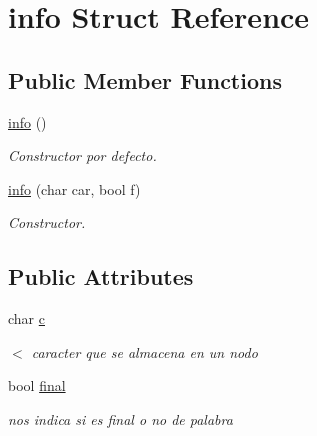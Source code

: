\hypertarget{structinfo}{\section{info Struct Reference}
\label{structinfo}
}
\subsection*{Public Member Functions}
\begin{DoxyCompactItemize}
\item 
\hypertarget{structinfo_af6a5d3bc4c62a93aba929cdaa518688b}{\hyperlink{structinfo_af6a5d3bc4c62a93aba929cdaa518688b}{info} ()}\label{structinfo_af6a5d3bc4c62a93aba929cdaa518688b}

\begin{DoxyCompactList}\small\item\em Constructor por defecto. \end{DoxyCompactList}\item 
\hyperlink{structinfo_aba5645c74337381b0dd25577ab8e3697}{info} (char car, bool f)
\begin{DoxyCompactList}\small\item\em Constructor. \end{DoxyCompactList}\end{DoxyCompactItemize}
\subsection*{Public Attributes}
\begin{DoxyCompactItemize}
\item 
\hypertarget{structinfo_ac4538383891b4f55b84189fdb3af700f}{char \hyperlink{structinfo_ac4538383891b4f55b84189fdb3af700f}{c}}\label{structinfo_ac4538383891b4f55b84189fdb3af700f}

\begin{DoxyCompactList}\small\item\em $<$ caracter que se almacena en un nodo \end{DoxyCompactList}\item 
\hypertarget{structinfo_a1b66486bf4c191788c85723ba71df997}{bool \hyperlink{structinfo_a1b66486bf4c191788c85723ba71df997}{final}}\label{structinfo_a1b66486bf4c191788c85723ba71df997}

\begin{DoxyCompactList}\small\item\em nos indica si es final o no de palabra \end{DoxyCompactList}\end{DoxyCompactItemize}


